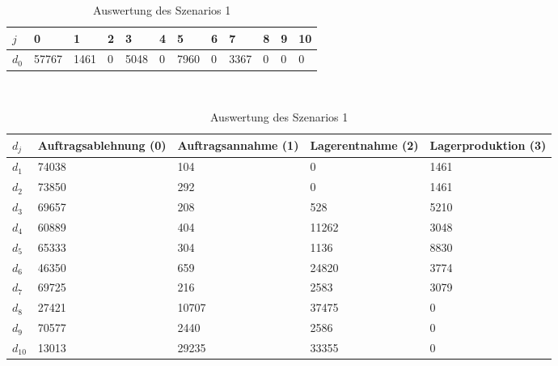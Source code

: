 \begin{table}[h!]
\renewcommand{\arraystretch}{1.5}
  \begin{center}
    \caption{Auswertung des Szenarios 1}  \label{AS1}
    \vspace*{3mm}
    \begin{tabular}{l l l l l l l l l l l l }  \hline 
         $j$ & 0 & 1  & 2 & 3 & 4  & 5 & 6 & 7 & 8 & 9 & 10  \\ \hline
$d_{0}$ &  57767 &  1461 &  0 &  5048 &  0 &  7960 &  0 &  3367 &  0 &  0 &  0 \\
\hline
    \end{tabular} \\[3mm]
        \begin{tabular}{ l p{2.5cm} p{2.5cm} p{2.5cm} p{2.5cm} }   \hline    %
    $d_j$ & Auftrags\-ablehnung (0) & Auftrags\-annahme (1)  & Lager\-entnahme (2) & Lager\-produktion (3)\\\hline 
$d_{1}$  &  74038 &    104 &    0 &  1461 \\
$d_{2}$  &  73850 &    292 &    0 &  1461 \\
$d_{3}$  &  69657 &    208 &    528 &  5210 \\
$d_{4}$  &  60889 &    404 &  11262 &  3048 \\
$d_{5}$  &  65333 &    304 &   1136 &  8830 \\
$d_{6}$  &  46350 &    659 &  24820 &  3774 \\
$d_{7}$  &  69725 &    216 &   2583 &  3079 \\
$d_{8}$  &  27421 &  10707 &  37475 &   0 \\
$d_{9}$  &  70577 &   2440 &   2586 &   0 \\
$d_{10}$ &  13013 &  29235 &  33355 &   0 \\
          \hline
   \end{tabular} \\[3mm]
     \end{center}
\end{table}

